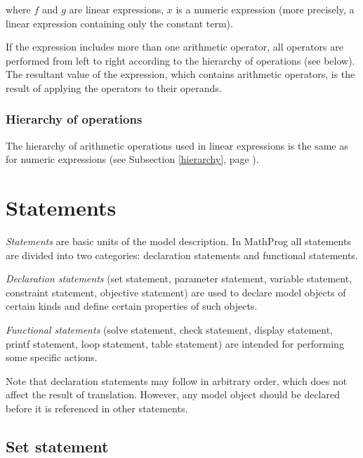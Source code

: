 \documentclass[11pt]{report}
\begin{document}
\noindent where $f$ and $g$ are linear expressions, $x$ is a numeric
expression (more precisely, a linear expression containing only the
constant term).

If the expression includes more than one arithmetic operator, all
operators are performed from left to right according to the hierarchy
of operations (see below). The resultant value of the expression, which
contains arithmetic operators, is the result of applying the operators
to their operands.

\subsection{Hierarchy of operations}

The hierarchy of arithmetic operations used in linear expressions is
the same as for numeric expressions (see Subsection \ref{hierarchy},
page \pageref{hierarchy}).


\chapter{Statements}

{\it Statements} are basic units of the model description. In MathProg
all statements are divided into two categories: declaration statements
and functional statements.

{\it Declaration statements} (set statement, parameter statement,
variable statement, constraint statement, objective statement) are used
to declare model objects of certain kinds and define certain properties
of such objects.

{\it Functional statements} (solve statement, check statement, display
statement, printf statement, loop statement, table statement) are
intended for performing some specific actions.

Note that declaration statements may follow in arbitrary order, which
does not affect the result of translation. However, any model object
should be declared before it is referenced in other statements.

\section{Set statement}

\noindent
{}
\end{document}
